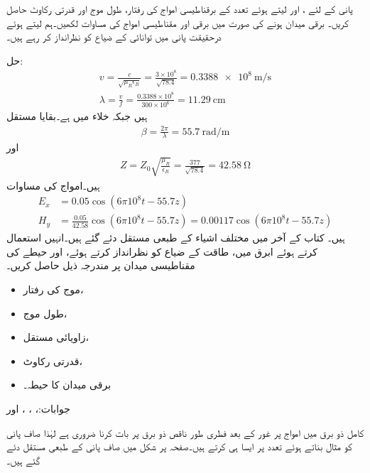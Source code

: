پانی کے لئے ،  اور  لیتے ہوئے  تعدد کے برقناطیسی امواج کی رفتار، طول موج اور قدرتی رکاوٹ حاصل کریں۔ برقی میدان  ہونے کی صورت میں برقی اور مقناطیسی امواج کی مساوات لکھیں۔ہم  لیتے ہوئے درحقیقت پانی میں توانائی کے ضیاع کو نظرانداز کر رہے ہیں۔

حل:
\begin{align*}
v=\frac{c}{\sqrt{\mu_R \epsilon_R}}=\frac{3 \times 10^8}{\sqrt{78.4}}=\SI{0.3388e8}{\meter \per \second}\\
\lambda=\frac{v}{f}=\frac{0.3388 \times 10^8}{300 \times 10^6}=\SI{11.29}{\centi\meter}
\end{align*}
ہیں جبکہ خلاء میں  ہے۔بقایا مستقل
\begin{align*}
\beta=\frac{2\pi}{\lambda}=\SI{55.7}{\radian \per \meter}
\end{align*}
اور
\begin{align*}
Z=Z_0 \sqrt{\frac{\mu_R}{\epsilon_R}}=\frac{377}{\sqrt{78.4}}=\SI{42.58}{\ohm}
\end{align*}
ہیں۔امواج کی مساوات
\begin{align*}
E_x&=0.05 \cos (6\pi 10^8 t -55.7 z)\\
H_y&=\frac{0.05}{42.58} \cos (6\pi 10^8 t -55.7 z)=0.00117 \cos (6\pi 10^8 t -55.7 z)
\end{align*}
ہیں۔
کتاب کے آخر میں مختلف اشیاء کے طبعی مستقل دئے گئے ہیں۔انہیں استعمال کرتے ہوئے  ابرق میں، طاقت کے ضیاع کو نظرانداز کرتے ہوئے،   اور  حیطے  کی مقناطیسی میدان پر مندرجہ ذیل حاصل کریں۔
\begin{itemize}
\item
موج کی رفتار،
\item
طول موج،
\item
زاویائی مستقل،
\item
قدرتی رکاوٹ،
\item
برقی میدان کا حیطہ۔
\end{itemize} 

جوابات:، ، ،  اور 

کامل ذو برق میں امواج پر غور کے بعد فطری طور ناقص ذو برق پر بات کرنا ضروری ہے لہٰذا صاف پانی کو مثال بناتے ہوئے    تعدد پر  ایسا ہی کرتے ہیں۔صفحہ  پر شکل  میں صاف پانی کے طبعی مستقل دئے گئے ہیں۔

